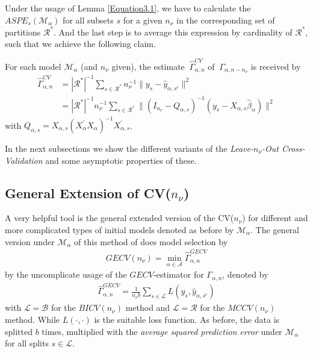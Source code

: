 \documentclass[Research_Module_ES.tex]{subfiles}
\begin{document}
Under the usage of Lemma \ref{Equation3.1}, we have to calculate the $ASPE_{s}(\mathcal{M}_\alpha)$ for all subsets $s$  for a given $n_\nu$ in the corresponding set of partitions $\mathcal{R}^\ast$. And the last step is to average this expression by cardinality of $\mathcal{R}^\ast$, such that we achieve the following claim.

\begin{claim}
	\label{estimator CV(n_v)}
	For each model $\mathcal{M}_\alpha$ (and $n_\nu$ given), the estimate $~\hat{\Gamma}_{\alpha,n}^{CV}$ of $~\Gamma_{\alpha,n-n_\nu}$ is received by
	\begin{align*}
		\hat{\Gamma}_{\alpha,n}^{CV}&=|\mathcal{R}^\ast|^{-1}\sum_{s\in \mathcal{R}^\ast}n_\nu^{-1}\parallel y_s-\hat{y}_{\alpha,s^c}\parallel^2\\
		&=|\mathcal{R}^\ast|^{-1}n_\nu^{-1}\sum_{s\in \mathcal{R}^\ast}\parallel (I_{n_\nu}-Q_{\alpha,s})^{-1}(y_s-X_{\alpha,s}\hat{\beta}_\alpha)\parallel^2
	\end{align*}	
	with $Q_{\alpha,s}=X_{\alpha,s}(X_\alpha^\prime X_\alpha)^{-1}X_{\alpha,s}^\prime$.
\end{claim}
In the next subsections we show the different variants of the \textit{Leave-$n_\nu$-Out Cross-Validation} and some asymptotic properties of these.

	







\subsection{General Extension of CV($n_\nu$)}
A very helpful tool is the general extended version of the CV($n_\nu$) for different and more complicated types of initial models denoted as before by $\mathcal{M}_\alpha$. The general version under $\mathcal{M}_\alpha$ of this method of \cite{shao} does model selection by 
\begin{align*}
	GECV(n_\nu)=\min_{\alpha\in\mathcal{A}}\hat{\Gamma}_{\alpha,n}^{GECV}
\end{align*}
by the uncomplicate usage of the $GECV$-estimator for $\Gamma_{\alpha,n}$, denoted by
\begin{align*}
	\hat{\Gamma}_{\alpha,n}^{GECV}=\frac{1}{n_\nu b}\sum_{s\in\mathcal{L}}L(y_s,\hat{y}_{\alpha,s^c})
\end{align*} 
with $\mathcal{L}=\mathcal{B}$ for the $BICV(n_\nu)$ method and $\mathcal{L}=\mathcal{R}$ for the $MCCV(n_\nu)$ method. While $L(\cdot,\cdot)$ is the suitable loss function. As before, the data is splitted $b$ times, multiplied with the \textit{average squared prediction error} under $\mathcal{M}_\alpha$ for all splits $s\in\mathcal{L}$.
\end{document}
